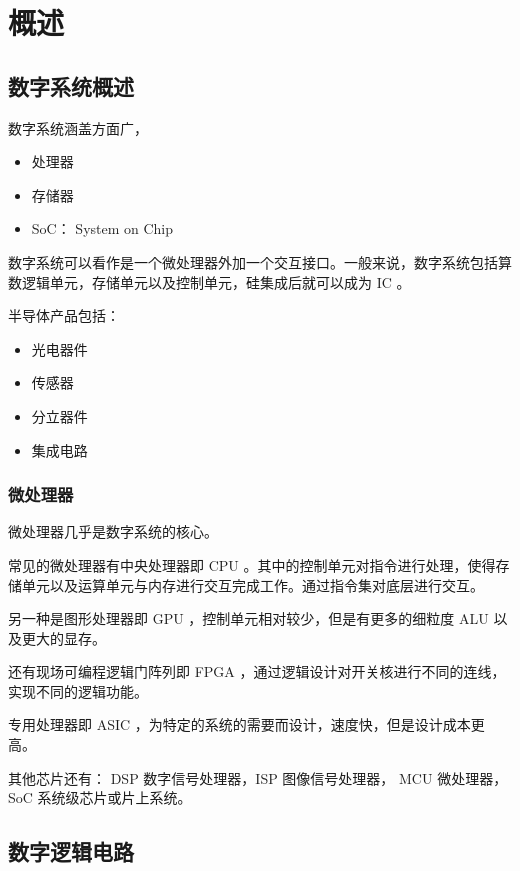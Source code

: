 \documentclass[cn,11pt,chinese,black,simple]{../elegantbook}
\begin{document}
\fi 
\def\chapname{01digitalsys}

\chapter{概述}

\section{数字系统概述}

数字系统涵盖方面广，

\begin{itemize}
    \item 处理器
    \item 存储器
    \item SoC： System on Chip
\end{itemize}

数字系统可以看作是一个微处理器外加一个交互接口。一般来说，数字系统包括算数逻辑单元，存储单元以及控制单元，硅集成后就可以成为 IC 。



半导体产品包括：

\begin{itemize}
    \item 光电器件
    \item 传感器
    \item 分立器件
    \item 集成电路
\end{itemize}

\subsection{微处理器}

微处理器几乎是数字系统的核心。

常见的微处理器有中央处理器即 CPU 。其中的控制单元对指令进行处理，使得存储单元以及运算单元与内存进行交互完成工作。通过指令集对底层进行交互。

另一种是图形处理器即 GPU ，控制单元相对较少，但是有更多的细粒度 ALU 以及更大的显存。

还有现场可编程逻辑门阵列即 FPGA ，通过逻辑设计对开关核进行不同的连线，实现不同的逻辑功能。

专用处理器即 ASIC ，为特定的系统的需要而设计，速度快，但是设计成本更高。

其他芯片还有： DSP 数字信号处理器，ISP 图像信号处理器， MCU 微处理器， SoC 系统级芯片或片上系统。

\section{数字逻辑电路}
\end{document}
